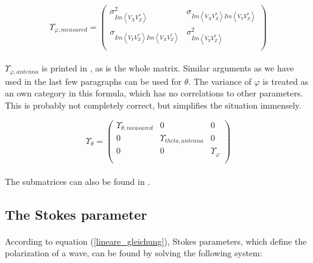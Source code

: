 \documentclass[a4paper,10pt]{thesis}
\begin{document}
\begin{equation}\label{var-covar-matr_measured}
\Upsilon_{\varphi,measured}=\left(%
\begin{array}{cc}
  \sigma_{Im \left\langle V_X V_Z^{*}\right \rangle}^2 & \sigma_{Im \left\langle V_X V_Z^{*}\right\rangle Im \left\langle V_Y V_Z^{*}\right\rangle} \\
 \sigma_{Im \left\langle V_Y V_Z^{*}\right\rangle Im \left\langle V_X V_Z^{*}\right\rangle} & \sigma_{Im \left\langle V_Y V_Z^{*}\right\rangle}^2 \\
\end{array}
\right)
\end{equation}

\paragraph*{}
$\Upsilon_{\varphi,antenna}$ is printed in \cite{DF}, as is the whole matrix. Similar arguments as we have used in the last few paragraphs can be used for $\theta$. The variance of $\varphi$ is treated as an own category in this formula, which has no correlations to other parameters. This is probably not completely correct, but simplifies the situation immensely.

\begin{equation}\label{var-covar-matr_theta_simpli2}
\Upsilon_\theta=\left(%
\begin{array}{ccc}
  \Upsilon_{\theta,measured} & 0 &0 \\
0 & \Upsilon_{theta,antenna} & 0\\
0 & 0 & \Upsilon_\varphi\\
\end{array}%
\right)
\end{equation}

\paragraph*{}
The submatrices can also be found in \cite{antenna_report_1}.

\subsection{The Stokes parameter}
\paragraph*{}
According to equation (\ref{lineare_gleichung}), Stokes parameters, which define the polarization of a wave, can be found by solving the following system:
\end{document}
